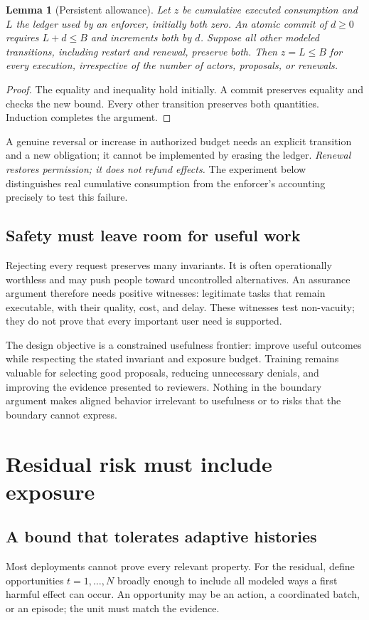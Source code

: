 \documentclass[10pt,twocolumn,letterpaper]{article}
\newtheorem{lemma}{Lemma}
\begin{document}
\begin{lemma}[Persistent allowance]
\label{lem:ledger}
Let $z$ be cumulative executed consumption and $L$ the ledger used by an enforcer, initially both zero. An atomic commit of $d\ge0$ requires $L+d\le B$ and increments both by $d$. Suppose all other modeled transitions, including restart and renewal, preserve both. Then $z=L\le B$ for every execution, irrespective of the number of actors, proposals, or renewals.
\end{lemma}
\begin{proof}
The equality and inequality hold initially. A commit preserves equality and checks the new bound. Every other transition preserves both quantities. Induction completes the argument.
\end{proof}
A genuine reversal or increase in authorized budget needs an explicit transition and a new obligation; it cannot be implemented by erasing the ledger. \emph{Renewal restores permission; it does not refund effects.} The experiment below distinguishes real cumulative consumption from the enforcer's accounting precisely to test this failure.

\subsection{Safety must leave room for useful work}
Rejecting every request preserves many invariants. It is often operationally worthless and may push people toward uncontrolled alternatives. An assurance argument therefore needs positive witnesses: legitimate tasks that remain executable, with their quality, cost, and delay. These witnesses test non-vacuity; they do not prove that every important user need is supported.

The design objective is a constrained usefulness frontier: improve useful outcomes while respecting the stated invariant and exposure budget. Training remains valuable for selecting good proposals, reducing unnecessary denials, and improving the evidence presented to reviewers. Nothing in the boundary argument makes aligned behavior irrelevant to usefulness or to risks that the boundary cannot express.

\section{Residual risk must include exposure}
\label{sec:risk}

\subsection{A bound that tolerates adaptive histories}
Most deployments cannot prove every relevant property. For the residual, define opportunities $t=1,\ldots,N$ broadly enough to include all modeled ways a first harmful effect can occur. An opportunity may be an action, a coordinated batch, or an episode; the unit must match the evidence.
\end{document}
